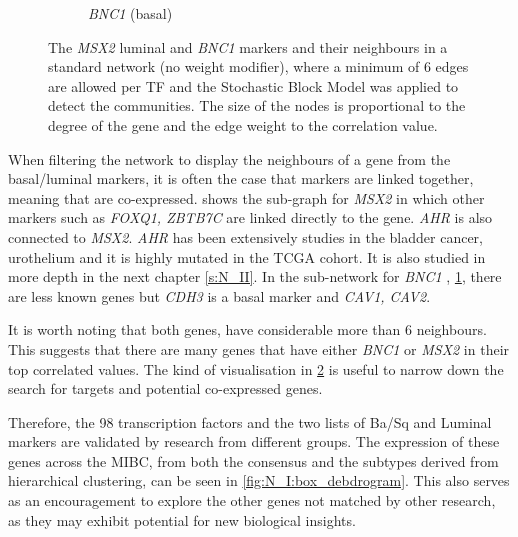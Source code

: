 \begin{figure}[!t]
\begin{subfigure}[!t]{0.49\textwidth}
        \caption{\textit{BNC1} (basal)}
        \label{fig:N_I:net_BNC1}
    \end{subfigure}
    \caption[Network neighbours of \textit{MSX2} and \textit{BNC1}]{The \textit{MSX2} luminal and \textit{BNC1} markers and their neighbours in a standard network (no weight modifier), where a minimum of 6 edges are allowed per TF and the Stochastic Block Model was applied to detect the communities. The size of the nodes is proportional to the degree of the gene and the edge weight to the correlation value.}
    
    \label{fig:N_I:net_neighbours}
\end{figure}

When filtering the network to display the neighbours of a  gene from the basal/luminal markers, it is often the case that markers are linked together, meaning that are co-expressed.  shows the sub-graph for \textit{MSX2} in which other markers such as \textit{FOXQ1, ZBTB7C} are linked directly to the gene. \textit{AHR} is also connected to \textit{MSX2}. \textit{AHR} has been extensively studies in the bladder cancer, urothelium and it is highly mutated in the TCGA cohort. It is also studied in more depth in the next chapter \ref{s:N_II}. In the sub-network for \textit{BNC1} , \cref{fig:N_I:net_BNC1}, there are less known genes but \textit{CDH3} is a basal marker \citep{Dadhania2016-cb} and \textit{CAV1, CAV2}. 

It is worth noting that both genes, have considerable more than 6 neighbours. This suggests that there are many genes that have either \textit{BNC1} or \textit{MSX2} in their top correlated values. The kind of visualisation in \cref{fig:N_I:net_neighbours} is useful to narrow down the search for targets and potential co-expressed genes.


Therefore, the 98 transcription factors and the two lists of Ba/Sq and Luminal markers are validated by research from different groups. The expression of these genes across the MIBC, from both the consensus and the subtypes derived from hierarchical clustering, can be seen in \cref{fig:N_I:box_debdrogram}. This also serves as an encouragement to explore the other genes not matched by other research, as they may exhibit potential for new biological insights.


